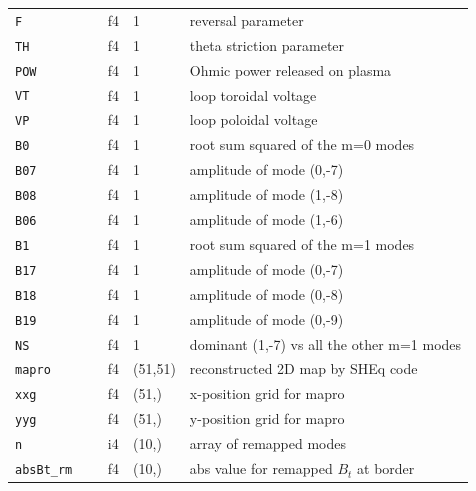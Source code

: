 \begin{table}[]
\begin{tabular}{l|l|l|l}
\verb|F          | & f4         & 1         &   reversal parameter                                  \\
\verb|TH         | & f4         & 1         &   theta striction parameter                           \\
\verb|POW        | & f4         & 1         &   Ohmic power released on plasma                      \\
\verb|VT         | & f4         & 1         &   loop toroidal voltage                               \\
\verb|VP         | & f4         & 1         &   loop poloidal voltage                               \\
\verb|B0         | & f4         & 1         &   root sum squared of the m=0 modes                   \\
\verb|B07        | & f4         & 1         &   amplitude of mode (0,-7)                            \\
\verb|B08        | & f4         & 1         &   amplitude of mode (1,-8)                            \\
\verb|B06        | & f4         & 1         &   amplitude of mode (1,-6)                            \\
\verb|B1         | & f4         & 1         &   root sum squared of the m=1 modes                   \\
\verb|B17        | & f4         & 1         &   amplitude of mode (0,-7)                            \\
\verb|B18        | & f4         & 1         &   amplitude of mode (0,-8)                            \\
\verb|B19        | & f4         & 1         &   amplitude of mode (0,-9)                            \\
\verb|NS         | & f4         & 1         &   dominant (1,-7) vs all the other m=1 modes          \\
\verb|mapro      | & f4         & (51,51)   &   reconstructed 2D map by SHEq code                   \\
\verb|xxg        | & f4         & (51,)     &   x-position grid for mapro                           \\
\verb|yyg        | & f4         & (51,)     &   y-position grid for mapro                           \\
\verb|n          | & i4         & (10,)     &   array of remapped modes                             \\
\verb|absBt_rm   | & f4         & (10,)     &   abs value for remapped $B_t$ at border              \\

\end{tabular}
\end{table}
